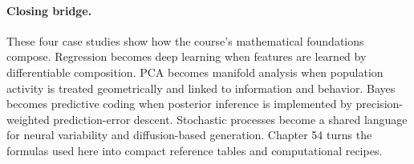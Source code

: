 \paragraph{Closing bridge.}
These four case studies show how the course's mathematical foundations compose. Regression becomes deep learning when features are learned by differentiable composition. PCA becomes manifold analysis when population activity is treated geometrically and linked to information and behavior. Bayes becomes predictive coding when posterior inference is implemented by precision-weighted prediction-error descent. Stochastic processes become a shared language for neural variability and diffusion-based generation. Chapter 54 turns the formulas used here into compact reference tables and computational recipes.

\clearpage
